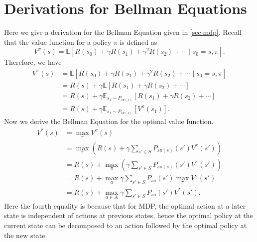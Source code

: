 \chapter{Derivations for Bellman Equations}\label{sec:bellman_derivation}
Here we give a derivation for the Bellman Equation given in \cref{sec:mdp}. Recall
that the value function for a policy $\pi$ is defined as
\[
V^\pi(s) = \mathbb E \left[ R(s_0) + \gamma R(s_1 ) + \gamma^2 R(s_2) + \cdots \mid s_0 = s,\pi\right].
\]
Therefore, we have
\begin{align*}
    V^\pi(s) &= \mathbb E \left[ R(s_0) + \gamma R(s_1 ) + \gamma^2 R(s_2) + \cdots \mid s_0 = s,\pi\right]\\
        &= R(s) + \gamma \mathbb E[R(s_1 ) + \gamma R(s_2) + \cdots]\\
        &= R(s) + \gamma \mathbb E_{s_1 \sim P_{s\pi(s)}} [R(s_1 ) + \gamma R(s_2) + \cdots]\\
        &= R(s) + \gamma \mathbb E_{s_1 \sim P_{s\pi(s)}} [V^\pi(s_1)]. %
\end{align*}
Now we derive the Bellman Equation for the optimal value function. %
\begin{align*}
    V^*(s) &= \max_\pi V^\pi(s)\\
        &= \max_\pi \left( R(s) + \gamma  \sum_{s'\in S} P_{s\pi(s)}(s')V^\pi(s') \right)\\
        &= R(s) + \max_\pi \left(\gamma \sum_{s'\in S} P_{s\pi(s)}(s')V^\pi(s') \right)\\
        &= R(s) + \max_a \gamma \sum_{s'\in S} P_{sa}(s') \max_\pi V^\pi(s')\\
        &= R(s) + \max_{a\in A} \gamma \sum_{s'\in S} P_{sa}(s')V^*(s').
\end{align*}
Here the fourth equality is because that for MDP, the optimal action at a
later state is independent of actions at previous states, hence the optimal
policy at the current state can be decomposed to an action followed by the
optimal policy at the new state.
